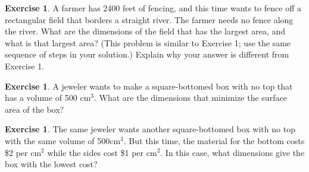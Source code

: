 \documentclass[11pt,reqno,final]{amsart}
\numberwithin{figure}{section}
\theoremstyle{definition} %
\newtheorem{exercise}[question]{Exercise}
\begin{document}
\newpage

\begin{exercise}
        A farmer has 2400 feet of fencing, and this time wants to fence off a rectangular field that borders a straight river. The farmer needs no fence along the river.
        What are the dimensions of the field that has the largest area, and what is that largest area?
        (This problem is similar to Exercise 1; use the same sequence of steps in your solution.)
        Explain why your answer is different from Exercise 1.
\end{exercise}

\newpage

\begin{exercise}
        A jeweler wants to make a square-bottomed box with no top that has a volume of 500 cm$^3$.
        What are the dimensions that minimize the surface area of the box?
        \vfill
\end{exercise}

\begin{exercise}
        The same jeweler wants another square-bottomed box with no top with the same volume of 500cm$^3$.
        But this time, the material for the bottom costs \$2 per cm$^2$ while the sides cost \$1 per cm$^2$.
        In this case, what dimensions give the box with the lowest cost?
        \vfill
\end{exercise}
\end{document}
